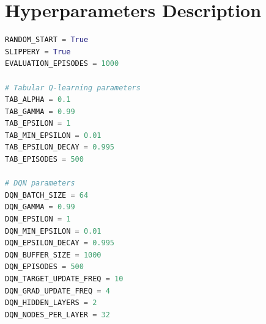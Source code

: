 \documentclass[a4paper,12pt]{article}
\begin{document}
\section{Hyperparameters Description}
\begin{lstlisting}[language=Python]
RANDOM_START = True
SLIPPERY = True
EVALUATION_EPISODES = 1000

# Tabular Q-learning parameters
TAB_ALPHA = 0.1
TAB_GAMMA = 0.99
TAB_EPSILON = 1
TAB_MIN_EPSILON = 0.01
TAB_EPSILON_DECAY = 0.995
TAB_EPISODES = 500

# DQN parameters
DQN_BATCH_SIZE = 64
DQN_GAMMA = 0.99
DQN_EPSILON = 1
DQN_MIN_EPSILON = 0.01
DQN_EPSILON_DECAY = 0.995
DQN_BUFFER_SIZE = 1000
DQN_EPISODES = 500
DQN_TARGET_UPDATE_FREQ = 10
DQN_GRAD_UPDATE_FREQ = 4
DQN_HIDDEN_LAYERS = 2
DQN_NODES_PER_LAYER = 32
\end{lstlisting}
\end{document}
